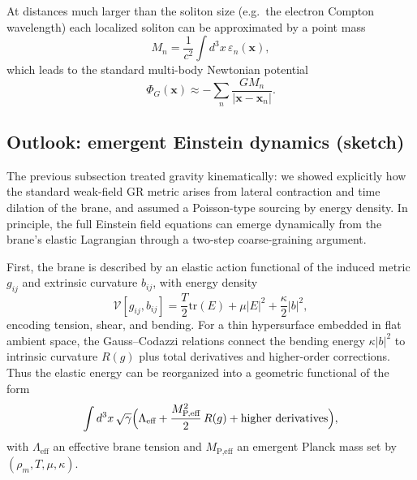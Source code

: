 At distances much larger than the soliton size (e.g.\ the electron Compton wavelength) each localized soliton can be approximated by a point mass
\begin{equation}
  M_n = \frac{1}{c^2} \int d^3x\, \varepsilon_n(\mathbf x),
\end{equation}
which leads to the standard multi-body Newtonian potential
\begin{equation}
  \Phi_G(\mathbf x) \approx -\sum_{n} \frac{G M_n}{|\mathbf x - \mathbf x_n|}.
\end{equation}

\subsection{Outlook: emergent Einstein dynamics (sketch)}
\label{sec:einstein-from-brane}

The previous subsection treated gravity kinematically: we showed explicitly how the standard weak-field GR metric arises from lateral contraction and time dilation of the brane, and assumed a Poisson-type sourcing by energy density. In principle, the full Einstein field equations can emerge dynamically from the brane's elastic Lagrangian through a two-step coarse-graining argument.

First, the brane is described by an elastic action functional of the induced metric $g_{ij}$ and extrinsic curvature $b_{ij}$, with energy density
\begin{equation}
\mathcal{V}[g_{ij},b_{ij}]
= \frac{T}{2}\mathrm{tr}(E)
+ \mu|E|^2
+ \frac{\kappa}{2}|b|^2,
\end{equation}
encoding tension, shear, and bending. For a thin hypersurface embedded in flat ambient space, the Gauss--Codazzi relations connect the bending energy $\kappa|b|^2$ to intrinsic curvature $R(g)$ plus total derivatives and higher-order corrections. Thus the elastic energy can be reorganized into a geometric functional of the form
\begin{equation}
\int d^3x\,\sqrt{\gamma}\Bigl(
\Lambda_\text{eff}
+ \frac{M_\text{P,eff}^2}{2}\,R(g)
+ \text{higher derivatives}
\Bigr),
\end{equation}
with $\Lambda_\text{eff}$ an effective brane tension and $M_\text{P,eff}$ an emergent Planck mass set by $(\rho_m,T,\mu,\kappa)$.

